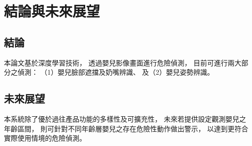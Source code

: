 \documentclass[class=NCU_thesis, crop=false]{standalone}
\begin{document}
\chapter{結論與未來展望}
\section{結論}
本論文基於深度學習技術，
透過嬰兒影像畫面進行危險偵測，
目前可進行兩大部分之偵測：
（1）嬰兒臉部遮擋及奶嘴辨識、
及（2）嬰兒姿勢辨識。

\section{未來展望}
本系統除了優於過往產品功能的多樣性及可擴充性，
未來若提供設定觀測嬰兒之年齡區間，
則可針對不同年齡層嬰兒之存在危險性動作做出警示，
以達到更符合實際使用情境的危險偵測。
\end{document}
